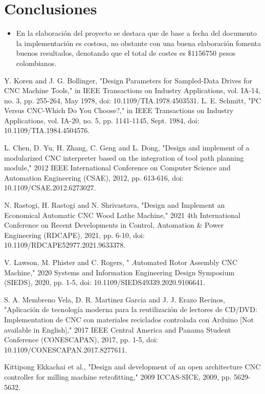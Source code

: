 \documentclass[conference]{IEEEtran}
\begin{document}
\section{Conclusiones}
\begin{itemize}
    \item En la elaboración del proyecto se destaca que de base a fecha del documento la implementación es costosa, no obstante con una buena elaboración fomenta buenos resultados, denotando que el total de costes es $\$1156750$ pesos colombianos.

\end{itemize}
\begin{thebibliography}{00}
 Y. Koren and J. G. Bollinger, "Design Parameters for Sampled-Data Drives for CNC Machine Tools," in IEEE Transactions on Industry Applications, vol. IA-14, no. 3, pp. 255-264, May 1978, doi: 10.1109/TIA.1978.4503531.
 L. E. Schmitt, "PC Versus CNC-Which Do You Choose?," in IEEE Transactions on Industry Applications, vol. IA-20, no. 5, pp. 1141-1145, Sept. 1984, doi: 10.1109/TIA.1984.4504576.

 L. Chen, D. Yu, H. Zhang, C. Geng and L. Dong, "Design and implement of a modularized CNC interpreter based on the integration of tool path planning module," 2012 IEEE International Conference on Computer Science and Automation Engineering (CSAE), 2012, pp. 613-616, doi: 10.1109/CSAE.2012.6273027.

N. Rastogi, H. Rastogi and N. Shrivastava, "Design and Implement an Economical Automatic CNC Wood Lathe Machine," 2021 4th International Conference on Recent Developments in Control, Automation & Power Engineering (RDCAPE), 2021, pp. 6-10, doi: 10.1109/RDCAPE52977.2021.9633378.

V. Lawson, M. Phister and C. Rogers, " $A$utomated Rotor Assembly CNC Machine," 2020 Systems and Information Engineering Design Symposium (SIEDS), 2020, pp. 1-5, doi: 10.1109/SIEDS49339.2020.9106641.

S. A. Membreno Vela, D. R. Martinez Garcia and J. J. Erazo Recinos, "Aplicación de tecnología moderna para la reutilización de lectores de CD/DVD: Implementation de CNC con materiales reciclados controlada con Arduino [Not available in English]," 2017 IEEE Central America and Panama Student Conference (CONESCAPAN), 2017, pp. 1-5, doi: 10.1109/CONESCAPAN.2017.8277611.


Kittipong Ekkachai et al., "Design and development of an open architecture CNC controller for milling machine retrofitting," 2009 ICCAS-SICE, 2009, pp. 5629-5632.


\end{thebibliography}
\end{document}
